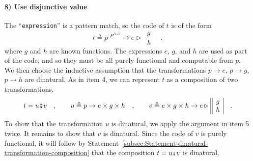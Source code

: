 \paragraph{8) Use disjunctive value }

The ``\lstinline!expression!'' is a pattern match, so the code
of $t$ is of the form 
\[
t\triangleq p^{:P^{A,A}}\rightarrow e\triangleright\,\begin{array}{||c|}
g\\
h
\end{array}\quad,
\]
where $g$ and $h$ are known functions. The expressions $e$, $g$,
and $h$ are used as part of the code, and so they must be all purely
functional and computable from $p$. We then choose the inductive
assumption that the transformations $p\rightarrow e$, $p\rightarrow g$,
$p\rightarrow h$ are dinatural. As in item 4, we can represent $t$
as a composition of two transformations, 
\[
t=u\bef v\quad,\quad\quad u\triangleq p\rightarrow e\times g\times h\quad,\quad\quad v\triangleq e\times g\times h\rightarrow e\triangleright\,\begin{array}{||c|}
g\\
h
\end{array}\quad.
\]
To show that the transformation $u$ is dinatural, we apply the argument
in item 5 twice. It remains to show that $v$ is dinatural. Since
the code of $v$ is purely functional, it will follow by Statement~\ref{subsec:Statement-dinatural-transformation-composition}
that the composition $t=u\bef v$ is dinatural.

